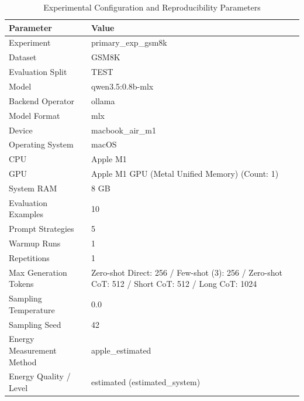 \begin{table}
\caption{Experimental Configuration and Reproducibility Parameters}
\label{tab:experimental_configuration}
\begin{tabular}{ll}
\toprule
Parameter & Value \\
\midrule
Experiment & primary\_exp\_gsm8k \\
Dataset & GSM8K \\
Evaluation Split & TEST \\
Model & qwen3.5:0.8b-mlx \\
Backend Operator & ollama \\
Model Format & mlx \\
Device & macbook\_air\_m1 \\
Operating System & macOS \\
CPU & Apple M1 \\
GPU & Apple M1 GPU (Metal Unified Memory) (Count: 1) \\
System RAM & 8 GB \\
Evaluation Examples & 10 \\
Prompt Strategies & 5 \\
Warmup Runs & 1 \\
Repetitions & 1 \\
Max Generation Tokens & Zero-shot Direct: 256 / Few-shot (3): 256 / Zero-shot CoT: 512 / Short CoT: 512 / Long CoT: 1024 \\
Sampling Temperature & 0.0 \\
Sampling Seed & 42 \\
Energy Measurement Method & apple\_estimated \\
Energy Quality / Level & estimated (estimated\_system) \\
\bottomrule
\end{tabular}
\end{table}
